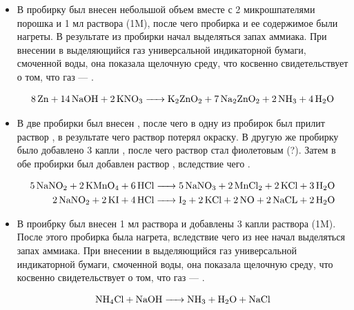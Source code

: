 \documentclass[a4paper, 12pt]{article}
\begin{document}
\begin{itemize}
\item

В пробирку был внесен небольшой объем  вместе с 2 микрошпателями порошка  и 1 мл раствора  (1M), после чего пробирка и ее содержимое были нагреты. В результате из пробирки начал выделяться запах аммиака. При внесении в выделяющийся газ универсальной индикаторной бумаги, смоченной воды, она показала щелочную среду, что косвенно свидетельствует о том, что газ --- .

\begin{equation}
	\ce{8 Zn + 14 NaOH + 2 KNO3 -> K2ZnO2 + 7Na2ZnO2 + 2NH3 + 4H2O}
\end{equation}

\item %

В две пробирки был внесен , после чего в одну из пробирок был прилит раствор , в результате чего раствор  потерял окраску. В другую же пробирку было добавлено 3 капли , после чего раствор стал фиолетовым (?). Затем в обе пробирки был добавлен раствор , вследствие чего .


\begin{align}
	\ce{5NaNO2 + 2KMnO4 + 6HCl -> 5 NaNO3 + 2 MnCl2 + 2 KCl + 3H2O}\\
	\ce{2 NaNO2 + 2 KI + 4 HCl -> I2 + 2 KCl + 2NO + 2 NaCL + 2H2O}
\end{align}

\item 


В проибрку был внесен 1 мл раствора  и добавлены 3 капли раствора  (1M). После этого пробирка была нагрета, вследствие чего из нее начал выделяться запах аммиака. При внесении в выделяющийся газ универсальной индикаторной бумаги, смоченной воды, она показала щелочную среду, что косвенно свидетельствует о том, что газ --- .

\begin{equation}
	\ce{NH4Cl + NaOH -> NH3 + H2O + NaCl}
\end{equation}
\end{itemize}
\end{document}
